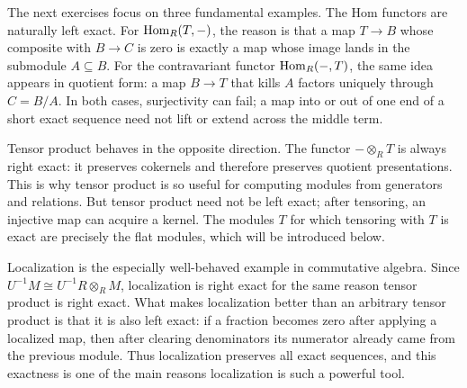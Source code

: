 \documentclass[Notebook.tex]{subfiles}
\begin{document}
The next exercises focus on three fundamental examples. The Hom functors are naturally left exact. For $\operatorname{Hom}_R(T,-)$, the reason is that a map $T\to B$ whose composite with $B\to C$ is zero is exactly a map whose image lands in the submodule $A\subseteq B$. For the contravariant functor $\operatorname{Hom}_R(-,T)$, the same idea appears in quotient form: a map $B\to T$ that kills $A$ factors uniquely through $C=B/A$. In both cases, surjectivity can fail; a map into or out of one end of a short exact sequence need not lift or extend across the middle term.

Tensor product behaves in the opposite direction. The functor $-\otimes_R T$ is always right exact: it preserves cokernels and therefore preserves quotient presentations. This is why tensor product is so useful for computing modules from generators and relations. But tensor product need not be left exact; after tensoring, an injective map can acquire a kernel. The modules $T$ for which tensoring with $T$ is exact are precisely the flat modules, which will be introduced below.

Localization is the especially well-behaved example in commutative algebra. Since $U^{-1}M\cong U^{-1}R\otimes_R M$, localization is right exact for the same reason tensor product is right exact. What makes localization better than an arbitrary tensor product is that it is also left exact: if a fraction becomes zero after applying a localized map, then after clearing denominators its numerator already came from the previous module. Thus localization preserves all exact sequences, and this exactness is one of the main reasons localization is such a powerful tool.


\hrulefill

\newpage 
\end{document}
